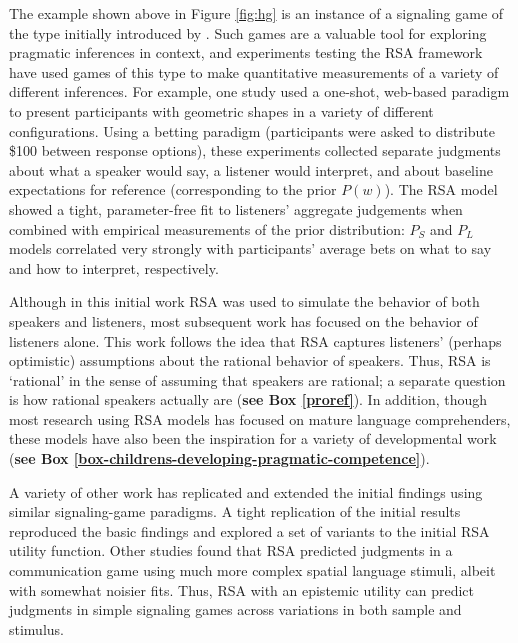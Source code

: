\documentclass[]{elsarticle}
\begin{document}
The example shown above in Figure \ref{fig:hg} is an instance of a signaling game of the type  initially introduced by \citet{lewis1969}. Such games are a valuable tool for exploring pragmatic inferences in context, and experiments testing the
RSA framework have used games of this type to make quantitative
measurements of a variety of different inferences. For example, one study \citep{frank2012} used a one-shot, web-based paradigm to present
participants with geometric shapes in a variety of different
configurations. Using a betting paradigm (participants were asked to
distribute \$100 between response options), these experiments collected
separate judgments about what a speaker would say, a listener would
interpret, and about baseline expectations for reference (corresponding
to the prior $P(w)$). The RSA model showed a tight, parameter-free fit
to listeners' aggregate judgements when combined
with empirical measurements of the prior distribution: 
$P_S$ and $P_L$ models correlated very strongly with participants' average bets on what to say and how to interpret, respectively. 

Although in this initial work RSA was used to simulate the behavior of
both speakers and listeners, most subsequent work has focused on the
behavior of listeners alone. This work follows the idea that RSA captures listeners'
(perhaps optimistic) assumptions about the rational behavior of
speakers. Thus, RSA is `rational' in the sense of assuming that
speakers are rational; a separate question is how rational speakers
actually are (\textbf{see Box \ref{proref}}).
In addition, though most research using RSA models has focused on mature language comprehenders, these models have also been the inspiration for a variety of developmental work (\textbf{see Box \ref{box-childrens-developing-pragmatic-competence}}).

A variety of other work has replicated and extended the initial findings
using similar signaling-game paradigms. A tight replication of the
initial results \citep{qing2015} reproduced the basic findings and
explored a set of variants to the initial RSA utility function.
Other studies \citep{carstensen2014} found that RSA
predicted judgments in a communication game using much more complex
spatial language stimuli, albeit with somewhat noisier fits. Thus, RSA
with an epistemic utility can predict judgments in simple signaling
games across variations in both sample and stimulus.
\end{document}

